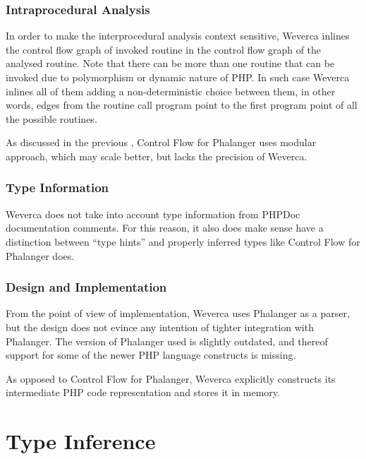     \subsubsection*{Intraprocedural Analysis}
    
    In order to make the interprocedural analysis context 
    sensitive, Weverca inlines the control flow graph of 
    invoked routine in the control flow graph of the 
    analysed routine. Note that there can be more than 
    one routine that can be invoked due to polymorphism 
    or dynamic nature of PHP. In such case Weverca 
    inlines all of them adding a non-deterministic choice 
    between them, in other words, edges from the routine call 
    program point to the first program point of all the 
    possible routines.
    
    As discussed in the previous \wchapter{}, Control Flow for 
    Phalanger uses modular approach, which may scale better, 
    but lacks the precision of Weverca.
    
    \subsubsection*{Type Information}
    
    Weverca does not take into account type information from 
    PHPDoc documentation comments. For this reason, it also 
    does make sense have a distinction between ``type hints'' 
    and properly inferred types like Control Flow for 
    Phalanger does.
    
    \subsubsection*{Design and Implementation}
    
    From the point of view of implementation, Weverca uses 
    Phalanger as a parser, but the design does not evince 
    any intention of tighter integration with Phalanger. 
    The version of Phalanger used is slightly outdated, 
    and thereof support for some of the newer PHP language 
    constructs is missing.
    
    As opposed to Control Flow for Phalanger, Weverca explicitly 
    constructs its intermediate PHP code representation 
    and stores it in memory.
    

    \section{Type Inference}
    
